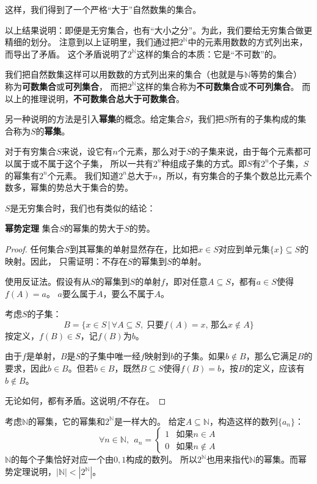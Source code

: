 \documentclass[12pt,UTF8,fontset=none]{ctexbook}
\begin{document}
这样，我们得到了一个严格“大于”自然数集的集合。

以上结果说明：即便是无穷集合，也有“大小之分”。为此，我们要给无穷集合做更精细的划分。
注意到以上证明里，我们通过把$2^\mathbb{N}$中的元素用数数的方式列出来，而导出了矛盾。
这个矛盾说明了$2^\mathbb{N}$这样的集合的本质：它是“不可数”的。

我们把自然数集这样可以用数数的方式列出来的集合（也就是与$\mathbb{N}$等势的集合）
称为\textbf{可数集合}或\textbf{可列集合}，
而把$2^\mathbb{N}$这样的集合称为\textbf{不可数集合}或\textbf{不可列集合}。
而以上的推理说明，\textbf{不可数集合总大于可数集合}。

另一种说明的方法是引入\textbf{幂集}的概念。给定集合$S$，我们把$S$所有的子集构成的集合称为$S$的\textbf{幂集}。

对于有穷集合$S$来说，设它有$n$个元素，那么对于$S$的子集来说，由于每个元素都可以属于或不属于这个子集，
所以一共有$2^n$种组成子集的方式。即$S$有$2^n$个子集，$S$的幂集有$2^n$个元素。
我们知道$2^n$总大于$n$，所以，有穷集合的子集个数总比元素个数多，幂集的势总大于集合的势。

$S$是无穷集合时，我们也有类似的结论：
\begin{tm}{\textbf{幂势定理}}
    集合$S$的幂集的势大于$S$的势。
\end{tm}

\begin{proof}
    任何集合$S$到其幂集的单射显然存在，比如把$x\in S$对应到单元集$\{x\}\subseteq S$的映射。因此，
    只需证明：不存在$S$的幂集到$S$的单射。
    
    使用反证法。假设有从$S$的幂集到$S$的单射$f$，即对任意$A\subseteq S$，都有$a\in S$使得$f(A) = a$。
    $a$要么属于$A$，要么不属于$A$。

    考虑$S$的子集：
    $$ B = \{x\in S \, | \, \forall A\subseteq S,\;\mbox{只要} f(A) = x,\,\mbox{那么} x\notin A\}$$
    按定义，$f(B)\in S$，记$f(B)$为$b$。
    
    由于$f$是单射，$B$是$S$的子集中唯一经$f$映射到$b$的子集。如果$b\notin B$，那么它满足$B$的要求，因此$b\in B$。但若$b\in B$，既然$B\subseteq S$使得$f(B)=b$，按$B$的定义，应该有$b \notin B$。

    无论如何，都有矛盾。这说明$f$不存在。
\end{proof}

考虑$\mathbb{N}$的幂集，它的幂集和$2^\mathbb{N}$是一样大的。
给定$A\subseteq \mathbb{N}$，构造这样的数列$\{a_n\}$：
$$\forall n \in \mathbb{N},\;\,
a_n = \begin{cases}
    1 & \mbox{如果} n \in A \\
    0 & \mbox{如果} n \notin A
\end{cases}
$$
$\mathbb{N}$的每个子集恰好对应一个由$0,1$构成的数列。
所以$2^\mathbb{N}$也用来指代$\mathbb{N}$的幂集。而幂势定理说明，$|\mathbb{N}| < |2^\mathbb{N}|$。
\end{document}
